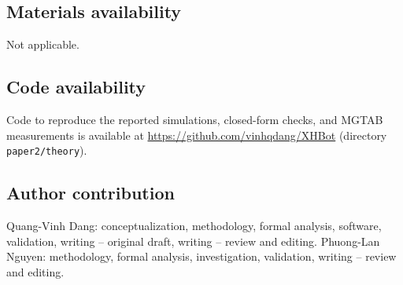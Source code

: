 \documentclass[onecolumn,pdflatex,sn-basic,Numbered]{sn-jnl}
\theoremstyle{thmstyleone}
\theoremstyle{thmstylethree}
\begin{document}
\subsection*{Materials availability}
Not applicable.

\subsection*{Code availability}
Code to reproduce the reported simulations, closed-form checks, and MGTAB
measurements is available at \url{https://github.com/vinhqdang/XHBot}
(directory \texttt{paper2/theory}).

\subsection*{Author contribution}
Quang-Vinh Dang: conceptualization, methodology, formal analysis, software,
validation, writing -- original draft, writing -- review and editing. Phuong-Lan
Nguyen: methodology, formal analysis, investigation, validation, writing -- review
and editing.
\end{document}
